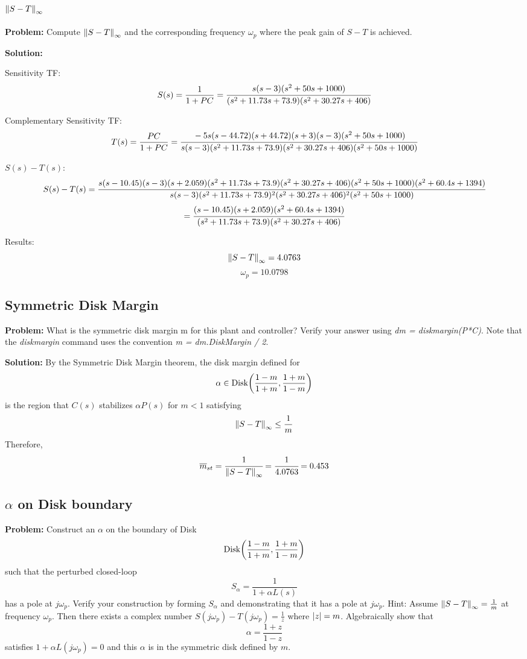 \documentclass[letter]{article}
\numberwithin{equation}{section}
\begin{document}
\subsection{$\norm{S-T}_\infty$}
\textbf{Problem:}
Compute $\norm{S-T}_\infty$ and the corresponding frequency $\omega_{p}$ where the peak gain of $S-T$ is achieved.

\textbf{Solution:} 

Sensitivity TF: \[
	S(s) = \frac{1}{1+PC}
		= \cfrac{
			s (s-3) (s^2 + 50s + 1000)
		}{
			(s^2 + 11.73s + 73.9) (s^2 + 30.27s + 406)
		}
\]

Complementary Sensitivity TF: \[
	T(s) = \frac{PC}{1+PC}
		= \cfrac{
			-5 s (s-44.72) (s+44.72) (s+3) (s-3) (s^2 + 50s + 1000)
		}{
			s (s-3) (s^2 + 11.73s + 73.9) (s^2 + 30.27s + 406) (s^2 + 50s + 1000)
		}
\]

$S(s)-T(s)$: \[
	S(s)-T(s) = \cfrac{
		s (s-10.45) (s-3) (s+2.059) (s^2 + 11.73s + 73.9) (s^2 + 30.27s + 406) (s^2 + 50s + 1000) (s^2 + 60.4s + 1394)
		}{
			s (s-3) (s^2 + 11.73s + 73.9)^2 (s^2 + 30.27s + 406)^2 (s^2 + 50s + 1000)
		}
\]\[
	= \cfrac{
		(s-10.45) (s+2.059) (s^2 + 60.4s + 1394)
		}{
			(s^2 + 11.73s + 73.9) (s^2 + 30.27s + 406)
		}
\]

Results:\[
	\norm{S-T}_\infty = 4.0763
\]\[
	\omega_{p} = 10.0798
\]

\subsection{Symmetric Disk Margin}
\textbf{Problem:}
What is the symmetric disk margin m for this plant and controller? 
Verify your answer using \emph{dm = diskmargin(P*C)}. 
Note that the \emph{diskmargin} command uses the convention \emph{m = dm.DiskMargin / 2}.

\textbf{Solution:}
By the Symmetric Disk Margin theorem, the disk margin defined for \[
	\alpha \in \text{Disk}\qty(\frac{1-m}{1+m},\frac{1+m}{1-m})
\] is the region that $C(s)$ stabilizes $\alpha P(s)$ for $m < 1$ satisfying\[
	\norm{S-T}_\infty \leq \frac{1}{m}
\] Therefore, \[
	\overline{m}_{st} = \cfrac{1}{\norm{S-T}_\infty} 
	= \cfrac{1}{4.0763} = 0.453
\]

\subsection{$\alpha$ on Disk boundary}
\textbf{Problem:}
Construct an $\alpha$ on the boundary of Disk \[
	\text{Disk}\qty(\frac{1-m}{1+m},\frac{1+m}{1-m})
\] such that the perturbed closed-loop \[
	S_\alpha = \frac{1}{1 + \alpha L(s)}
\] has a pole at $j\omega_p$. 
Verify your construction by forming $S_\alpha$ and demonstrating that it has a pole at $j \omega_p$.
Hint: Assume $\norm{S-T}_\infty = \frac{1}{m}$ at frequency $\omega_p$. 
Then there exists a complex number $S(j\omega_p) - T(j\omega_p) = \frac{1}{z}$ where $\abs{z} = m$.
Algebraically show that \[
	\alpha = \frac{1 + z}{1-z}
\] satisfies $1 + \alpha L(j\omega_p) = 0$ and this $\alpha$ is in the symmetric disk defined by $m$.
\end{document}
